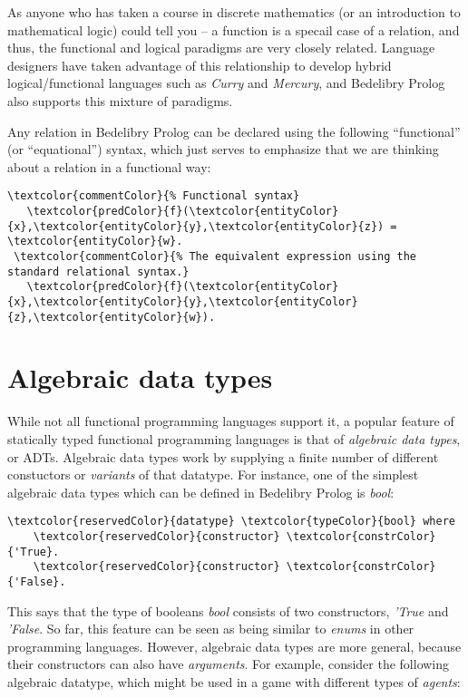 \documentclass{book}
\begin{document}
As anyone who has taken a course in discrete mathematics (or an introduction to mathematical logic) could tell you -- a function is a specail case of a relation, and thus, the functional and logical paradigms are very closely related. Language designers have taken advantage of this relationship to develop hybrid logical/functional languages such as \textit{Curry} and \textit{Mercury}, and Bedelibry Prolog also supports this mixture of paradigms.

Any relation in Bedelibry Prolog can be declared using the following ``functional'' (or ``equational'') syntax, which just serves to emphasize that we are thinking about a relation in a functional way: 

\begin{Verbatim}[commandchars=\\\{\}]
 \textcolor{commentColor}{% Functional syntax}
   \textcolor{predColor}{f}(\textcolor{entityColor}{x},\textcolor{entityColor}{y},\textcolor{entityColor}{z}) = \textcolor{entityColor}{w}.
 \textcolor{commentColor}{% The equivalent expression using the standard relational syntax.}
   \textcolor{predColor}{f}(\textcolor{entityColor}{x},\textcolor{entityColor}{y},\textcolor{entityColor}{z},\textcolor{entityColor}{w}).
\end{Verbatim}

\section{Algebraic data types}

While not all functional programming languages support it, a popular feature of statically typed functional programming languages is that of \textit{algebraic data types}, or ADTs. Algebraic data types work by supplying a finite number of different constuctors or \textit{variants} of that datatype. For instance, one of the simplest algebraic data types which can be defined in Bedelibry Prolog is \textit{bool}:

\begin{Verbatim}[commandchars=\\\{\}]
  \textcolor{reservedColor}{datatype} \textcolor{typeColor}{bool} where
    \textcolor{reservedColor}{constructor} \textcolor{constrColor}{'True}.
    \textcolor{reservedColor}{constructor} \textcolor{constrColor}{'False}.
\end{Verbatim}

\noindent This says that the type of booleans \textit{bool} consists of two constructors, \textit{'True} and \textit{'False}. So far, this feature can be seen as being similar to \textit{enums} in other programming languages. However, algebraic data types are more general, because their constructors can also have \textit{arguments}. For example, consider the following algebraic datatype, which might be used in a game with different types of \textit{agents}:
\end{document}
